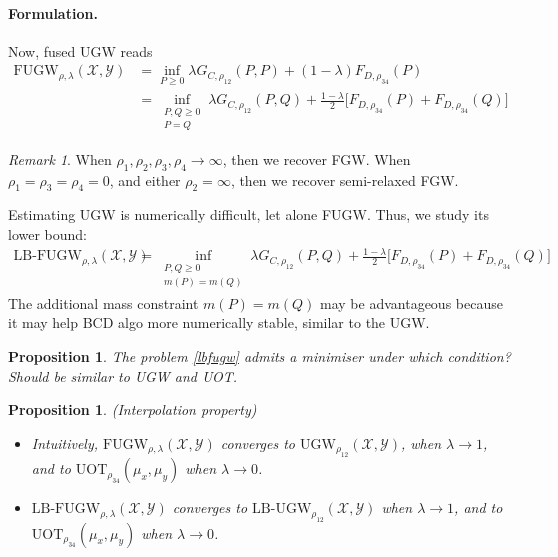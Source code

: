 \documentclass{article}
\newtheorem{proposition}[theorem]{Proposition}
\theoremstyle{remark}
\newtheorem{remark}[theorem]{Remark}
\begin{document}
\paragraph{Formulation.} Now, fused UGW reads
\begin{equation}
    \begin{split}
      \text{FUGW}_{\rho, \lambda}(\mathcal X, \mathcal Y) &= \inf_{P \geq 0} \lambda G_{C,\rho_{12}}(P, P) + (1 - \lambda) F_{D,\rho_{34}}(P) \\
        &= \inf_{\substack{P,Q \geq 0 \\ P = Q}} \lambda G_{C,\rho_{12}}(P,Q) + \frac{1 - \lambda}{2} \big[ F_{D,\rho_{34}}(P) + F_{D,\rho_{34}}(Q) \big]
    \end{split}
\end{equation}
\begin{remark}
    When $\rho_1, \rho_2, \rho_3, \rho_4 \to \infty$, then we recover FGW. When $\rho_1 = \rho_3 = \rho_4 = 0$, and either $\rho_2 = \infty$, then we recover semi-relaxed FGW.
\end{remark}
Estimating UGW is numerically difficult, let alone FUGW. Thus, we study its lower bound:
\begin{equation}
    \label{lbfugw}
    \begin{split}
       \text{LB-FUGW}_{\rho, \lambda}(\mathcal X, \mathcal Y) &= \inf_{\substack{P,Q \geq 0 \\ m(P) = m(Q)}} \lambda G_{C,\rho_{12}}(P,Q) + \frac{1 - \lambda}{2} \big[ F_{D,\rho_{34}}(P) + F_{D,\rho_{34}}(Q) \big]
    \end{split}
\end{equation}
The additional mass constraint $m(P) = m(Q)$ may be advantageous because it may help BCD algo more numerically stable, similar to the UGW.
\begin{proposition}
  The problem \ref{lbfugw} admits a minimiser under which condition? Should be similar to UGW and UOT.
\end{proposition}
\begin{proposition}
    \label{interpol_fugw}
    (Interpolation property)
    \begin{itemize}
        \item Intuitively, $\text{FUGW}_{\rho, \lambda}(\mathcal X, \mathcal Y)$ converges to $\text{UGW}_{\rho_{12}}(\mathcal X, \mathcal Y)$, when $\lambda \to 1$, and to $\text{UOT}_{\rho_{34}}(\mu_x, \mu_y)$ when $\lambda \to 0$.
        
        \item $\text{LB-FUGW}_{\rho, \lambda}(\mathcal X, \mathcal Y)$ converges to $\text{LB-UGW}_{\rho_{12}}(\mathcal X, \mathcal Y)$ when $\lambda \to 1$, and to $\text{UOT}_{\rho_{34}}(\mu_x, \mu_y)$ when $\lambda \to 0$.
    \end{itemize}
\end{proposition}
\end{document}
